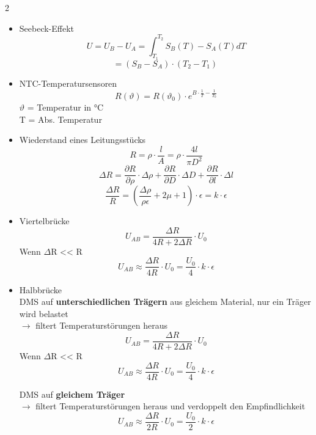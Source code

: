 \begin{multicols*}{2}
\begin{itemize}
	\vspace{1cm}

	\item Seebeck-Effekt
	\[ U = U_B - U_A = \int_{T_1}^{T_2} S_B(T) - S_A(T) dT \]
	\[ = (S_B - S_A) \cdot (T_2 - T_1) \ \]

	\vspace{1cm}
	
	\item  NTC-Temperatursensoren
	\[ R(\vartheta) = R(\vartheta_0)\cdot e^{B \cdot \frac{1}{T} - \frac{1}{T_0}} \]
	$\vartheta$ = Temperatur in °C\\
	T = Abs. Temperatur\\
	
	\vspace{1cm}
	
	\item Wiederstand eines Leitungsstücks
	\[ R = \rho \cdot \frac{l}{A} = \rho \cdot \frac{4l}{\pi D^2} \]
	\[ \Delta R = \frac{\partial R}{\partial \rho} \cdot \Delta\rho + \frac{\partial R}{\partial D} \cdot \Delta D + \frac{\partial R}{\partial l} \cdot \Delta l \]
	\[ \frac{\Delta R}{R} = \left( \frac{\Delta \rho}{\rho\epsilon} + 2\mu + 1 \right)\cdot\epsilon = k \cdot \epsilon \]
	
	\vspace{1cm}
	
	\item Viertelbrücke
	\[U_{AB} = \frac{\Delta R}{4R + 2\Delta R}\cdot U_0 \]
	Wenn $\Delta$R << R
	\[U_{AB} \approx \frac{\Delta R}{4R}\cdot U_0 = \frac{U_0}{4}\cdot k \cdot \epsilon\]
	
	\vspace{1cm}
	
	\item Halbbrücke\\
	DMS auf \textbf{unterschiedlichen Trägern} aus gleichem Material, nur ein Träger wird belastet\\
	$\rightarrow$ filtert Temperaturstörungen heraus
	\[U_{AB} = \frac{\Delta R}{4R + 2\Delta R}\cdot U_0 \]
	Wenn $\Delta$R << R
	\[U_{AB} \approx \frac{\Delta R}{4R}\cdot U_0 = \frac{U_0}{4}\cdot k \cdot \epsilon\]
	
	DMS auf \textbf{gleichem Träger}\\
	$\rightarrow$ filtert Temperaturstörungen heraus und verdoppelt den Empfindlichkeit
	\[U_{AB} \approx \frac{\Delta R}{2R}\cdot U_0 = \frac{U_0}{2}\cdot k \cdot \epsilon\]
	
	\vspace{1cm}
	

\end{itemize}
\end{multicols*}
